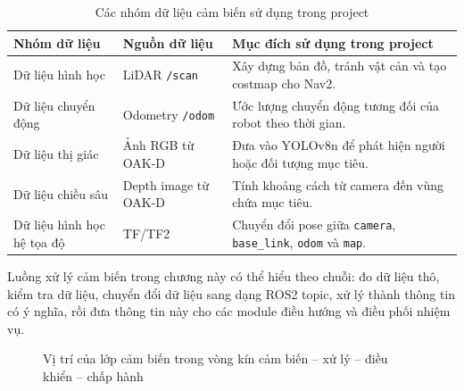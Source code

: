\begin{table}[H]
    \centering
    \caption{Các nhóm dữ liệu cảm biến sử dụng trong project}
    \label{tab:sensor-data-groups}
    \renewcommand{\arraystretch}{1.25}
    \small
    \begin{tabularx}{\textwidth}{|>{\raggedright\arraybackslash}p{}|>{\raggedright\arraybackslash}p{}|>{\raggedright\arraybackslash}X|}
        \hline
        \textbf{Nhóm dữ liệu} & \textbf{Nguồn dữ liệu} & \textbf{Mục đích sử dụng trong project} \\
        \hline
        Dữ liệu hình học & LiDAR \texttt{/scan} & Xây dựng bản đồ, tránh vật cản và tạo costmap cho Nav2. \\
        \hline
        Dữ liệu chuyển động & Odometry \texttt{/odom} & Ước lượng chuyển động tương đối của robot theo thời gian. \\
        \hline
        Dữ liệu thị giác & Ảnh RGB từ OAK-D & Đưa vào YOLOv8n để phát hiện người hoặc đối tượng mục tiêu. \\
        \hline
        Dữ liệu chiều sâu & Depth image từ OAK-D & Tính khoảng cách từ camera đến vùng chứa mục tiêu. \\
        \hline
        Dữ liệu hình học hệ tọa độ & TF/TF2 & Chuyển đổi pose giữa \texttt{camera}, \texttt{base\_link}, \texttt{odom} và \texttt{map}. \\
        \hline
    \end{tabularx}
\end{table}

Luồng xử lý cảm biến trong chương này có thể hiểu theo chuỗi: đo dữ liệu thô, kiểm tra dữ liệu, chuyển đổi dữ liệu sang dạng ROS2 topic, xử lý thành thông tin có ý nghĩa, rồi đưa thông tin này cho các module điều hướng và điều phối nhiệm vụ.

\begin{figure}[H]
\centering
{}
\caption{Vị trí của lớp cảm biến trong vòng kín cảm biến -- xử lý -- điều khiển -- chấp hành}
\label{fig:sensor-layer-feedback-loop}
\end{figure}

